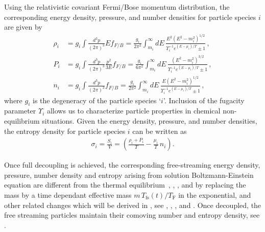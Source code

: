 Using the relativistic covariant Fermi/Bose momentum distribution, the corresponding energy density, pressure, and number densities for particle species $i$ are given by
\begin{align}
\rho_i&=g_i\int\!\!\frac{d^3p}{(2\pi)^3}Ef_{F/B}=\frac{g_i}{2\pi^2}\!\int_{m_i}^\infty\!\!\!dE\,\frac{E^2\left(E^2-m_i^2\right)^{1/2}}{\Upsilon_i^{-1}e^{(E-\mu_i)/T}\pm 1}\,,\label{energy_density}\\[0.2cm]
P_i&=g_i\int\!\!\frac{d^3p}{(2\pi)^3}\frac{p^2}{3E}f_{F/B}=\frac{g_i}{6\pi^2}\!\int_{m_i}^\infty\!\!\!dE\,\frac{\left(E^2-m_i^2\right)^{3/2}}{\Upsilon_i^{-1} e^{(E-\mu_i)/T}\pm 1}\,,\label{Pressure_density}\\[0.2cm]
n_i&=g_i\int\!\!\frac{d^3p}{(2\pi)^3}f_{F/B}=\frac{g_i}{2\pi^2}\!\int_{m_i}^\infty\!\!\!dE\,\frac{E(E^2-m_i^2)^{1/2} }{\Upsilon_i^{-1}e^{(E-\mu_i)/T}\pm 1}\,,
\label{number_density}
\end{align}
where $g_i$ is the degeneracy of the particle species `$i$'. Inclusion of the fugacity parameter $\Upsilon_i$ allows us to characterize particle properties in chemical non-equilibrium situations. Given the energy density, pressure, and number densities, the entropy density for particle species $i$ can be written as 
\begin{align}\label{entropy}
\sigma_i=\frac{S_i}{V}=\left(\frac{\rho_i+P_i}{T}-\frac{\mu_i}{T}\,n_i\right).
\end{align}

Once full decoupling is achieved, the corresponding free-streaming energy density, pressure, number density and entropy arising from solution Boltzmann-Einstein equation  are different from the thermal equilibrium~, ,  , and  by replacing the mass by a time dependant effective mass $m\,T_\mathrm{fs}(t)/T_\mathrm{F}$ in the exponential, and other related changes which will be derived in , see , , , and . Once decoupled, the free streaming particles maintain their comoving number and entropy density, see .


